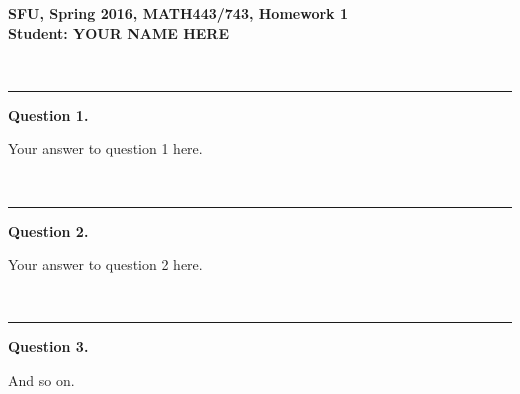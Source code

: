 \documentclass[11pt]{article}
\newcommand{\hnum}{1} %
\newcommand{\student}{YOUR NAME HERE}  %
\newcommand{\newquestion}[1]{\bigskip~\hrule \vspace*{3mm}\textbf{#1}}\bigskip
\begin{document}
\large

\begin{center}
  \textbf{\large SFU, Spring 2016, MATH443/743, Homework \hnum
    \\
    Student: \student}
\end{center}


\newquestion{Question 1.} 

Your answer to question 1 here.

\newquestion{Question 2.}

Your answer to question 2 here.

\newquestion{Question 3.} 

And so on.
\end{document}

